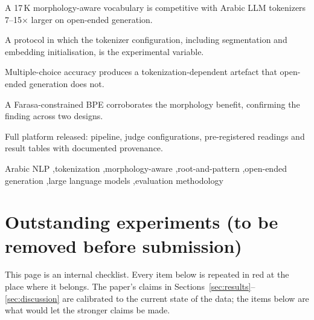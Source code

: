 \documentclass[a4paper,fleqn]{cas-sc}
\begin{document}
\begin{highlights}
\item A 17\,K morphology-aware vocabulary is competitive with Arabic LLM tokenizers 7--15$\times$ larger on open-ended generation.
\item A protocol in which the tokenizer configuration, including segmentation and embedding initialisation, is the experimental variable.
\item Multiple-choice accuracy produces a tokenization-dependent artefact that open-ended generation does not.
\item A Farasa-constrained BPE corroborates the morphology benefit, confirming the finding across two designs.
\item Full platform released: pipeline, judge configurations, pre-registered readings and result tables with documented provenance.
\end{highlights}

\begin{keywords}
Arabic NLP \sep tokenization \sep morphology-aware \sep root-and-pattern \sep open-ended generation \sep large language models \sep evaluation methodology
\end{keywords}

\maketitle

\section*{Outstanding experiments (to be removed before submission)}
This page is an internal checklist. Every item below is repeated in red at the place where it belongs. The paper's claims in Sections~\ref{sec:results}--\ref{sec:discussion} are calibrated to the current state of the data; the items below are what would let the stronger claims be made.
\end{document}

